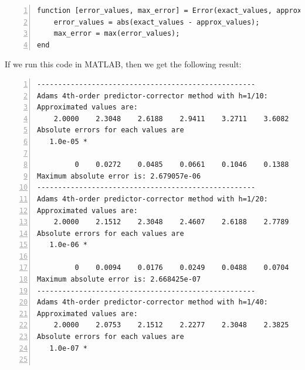 \documentclass{article}
\begin{document}
\begin{enumerate}
\begin{enumerate}[wide=10pt]
\begin{lstlisting}[frame=single, numbers=left, style=Matlab-editor]
function [error_values, max_error] = Error(exact_values, approx_values)
    error_values = abs(exact_values - approx_values);
    max_error = max(error_values);
end
        \end{lstlisting} If we run this code in MATLAB, then we get the following result: \begin{lstlisting}[frame=single, numbers=left, style=Matlab-editor]
----------------------------------------------------
Adams 4th-order predictor-corrector method with h=1/10:
Approximated values are:
    2.0000    2.3048    2.6188    2.9411    3.2711    3.6082    3.9520    4.3021    4.6580    5.0195    5.3863
Absolute errors for each values are
   1.0e-05 *

         0    0.0272    0.0485    0.0661    0.1046    0.1388    0.1693    0.1968    0.2222    0.2457    0.2679
Maximum absolute error is: 2.679057e-06
----------------------------------------------------
Adams 4th-order predictor-corrector method with h=1/20:
Approximated values are:
    2.0000    2.1512    2.3048    2.4607    2.6188    2.7789    2.9411    3.1051    3.2711    3.4388    3.6082    3.7793    3.9520    4.1263    4.3021    4.4793    4.6580    4.8381    5.0195    5.2023    5.3863
Absolute errors for each values are
   1.0e-06 *

         0    0.0094    0.0176    0.0249    0.0488    0.0704    0.0900    0.1079    0.1245    0.1399    0.1543    0.1678    0.1807    0.1929    0.2046    0.2158    0.2266    0.2371    0.2473    0.2572    0.2668
Maximum absolute error is: 2.668425e-07
----------------------------------------------------
Adams 4th-order predictor-corrector method with h=1/40:
Approximated values are:
    2.0000    2.0753    2.1512    2.2277    2.3048    2.3825    2.4607    2.5395    2.6188    2.6986    2.7789    2.8598    2.9411    3.0229    3.1051    3.1879    3.2711    3.3547    3.4388    3.5233    3.6082    3.6935    3.7793    3.8655    3.9520    4.0390    4.1263    4.2140    4.3021    4.3905    4.4793    4.5685    4.6580    4.7479    4.8381    4.9286    5.0195    5.1107    5.2023    5.2941    5.3863
Absolute errors for each values are
   1.0e-07 *


\end{lstlisting}
\end{enumerate}
\end{enumerate}
\end{document}

